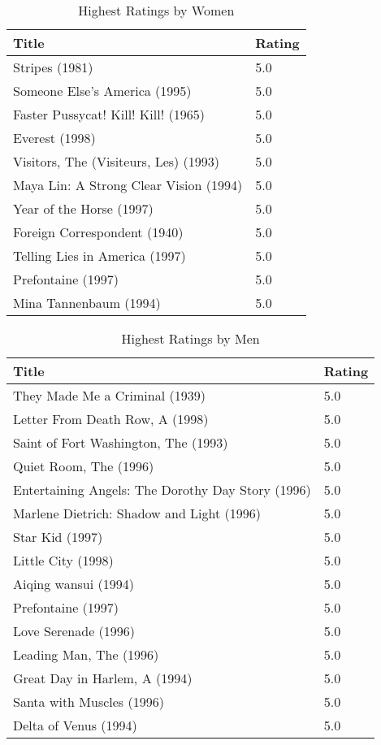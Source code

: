 \begin{table}[h!]
\centering
\begin{tabular}{| l | l |}
\hline
Title & Rating \\
\hline
Stripes (1981) & 5.0 \\
Someone Else's America (1995) & 5.0 \\
Faster Pussycat! Kill! Kill! (1965) & 5.0 \\
Everest (1998) & 5.0 \\
Visitors, The (Visiteurs, Les) (1993) & 5.0 \\
Maya Lin: A Strong Clear Vision (1994) & 5.0 \\
Year of the Horse (1997) & 5.0 \\
Foreign Correspondent (1940) & 5.0 \\
Telling Lies in America (1997) & 5.0 \\
Prefontaine (1997) & 5.0 \\
Mina Tannenbaum (1994) & 5.0 \\
\hline
\end{tabular}
\caption{Highest Ratings by Women}
\label{tab:hwratings}
\end{table}

\begin{table}[h!]
\centering
\begin{tabular}{| l | l |}
\hline
Title & Rating \\
\hline
They Made Me a Criminal (1939) & 5.0 \\
Letter From Death Row, A (1998) & 5.0 \\
Saint of Fort Washington, The (1993) & 5.0 \\
Quiet Room, The (1996) & 5.0 \\
Entertaining Angels: The Dorothy Day Story (1996) & 5.0 \\
Marlene Dietrich: Shadow and Light (1996)  & 5.0 \\
Star Kid (1997) & 5.0 \\
Little City (1998) & 5.0 \\
Aiqing wansui (1994) & 5.0 \\
Prefontaine (1997) & 5.0 \\
Love Serenade (1996) & 5.0 \\
Leading Man, The (1996) & 5.0 \\
Great Day in Harlem, A (1994) & 5.0 \\
Santa with Muscles (1996) & 5.0 \\
Delta of Venus (1994) & 5.0 \\
\hline
\end{tabular}
\caption{Highest Ratings by Men}
\label{tab:hmratings}
\end{table}

